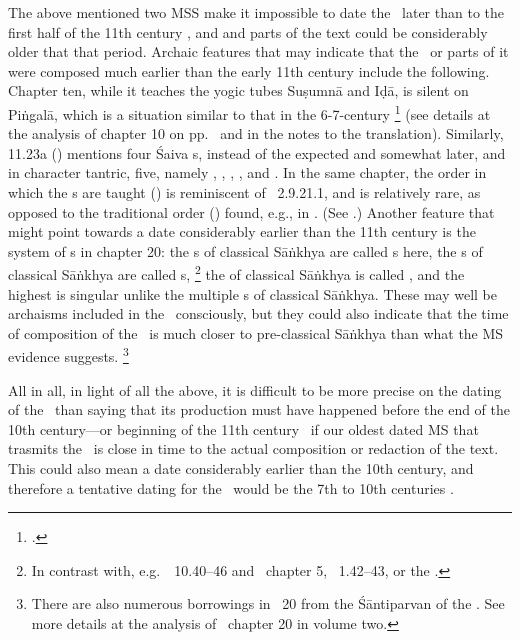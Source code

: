 The above mentioned two MSS make it 
impossible to date the \VSS\ later than to the first
half of the 11th century \CE, and and parts of the text
could be considerably older that that period.
Archaic features that may indicate 
that the \VSS\ or parts of it were
composed much earlier than the early 11th century
include the following. Chapter ten, 
while it teaches the yogic tubes
 Suṣumnā and Iḍā, is silent on Piṅgalā, 
which is a situation similar to that in 
the 6-7-century \Nisvnaya%
	\footnote{.}  
(see details at the analysis of chapter 10 on 
pp.~\pageref{no_pingala} and in the notes to 
the translation).  Similarly, 11.23a 
() mentions four 
Śaiva s, instead of the expected and 
somewhat later, and in character tantric, five, namely
, , , 
, and . In the same chapter,
the order in which the s are taught
() 
is reminiscent of \Apastambadharmasutra\ 2.9.21.1,
and is relatively rare,
as opposed to the traditional order () found, e.g., in
\MANU. (See .)
Another feature that might point towards a date
considerably earlier than the 11th century is the 
system of s in chapter 20:
the s of classical Sāṅkhya are called 
s here, the s of
classical Sāṅkhya are called s,%
		\footnote{In contrast with, e.g.\ \SDHU\ 10.40--46 and
					\UUMS\ chapter 5, \DHARMP\ 1.42--43, or the \SIVAUP.}
the  of classical Sāṅkhya
is called , and the highest  
is singular unlike the multiple s of classical 
Sāṅkhya. These may well be archaisms 
included in the \VSS\ consciously, but they could also
indicate that the time of composition of the \VSS\
is much closer to pre-classical Sāṅkhya than what the MS
evidence suggests.%
	\footnote{There are also numerous borrowings in \VSS\ 20
					from the Śāntiparvan of the \MBH. See more details
					at the analysis of \VSS\ chapter 20 in volume two.}

All in all, in light of all the above,
it is difficult to be more precise on the dating
of the \VSS\ than saying that its production must have
happened before the end of the 10th century---or beginning 
of the 11th century \CE\ if our oldest dated MS that trasmits
the \VSS\ is close in time to the actual composition or
redaction of the text. This could also mean a date considerably
earlier than the 10th century, and therefore a tentative dating
for the \VSS\ would be the 7th to 10th centuries \CE.

